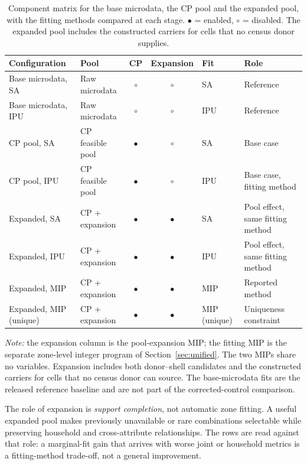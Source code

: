 \documentclass[review]{elsarticle}
\begin{document}
\begin{table}[htbp]
\centering
\caption{Component matrix for the base microdata, the CP pool and the expanded
pool, with the fitting methods compared at each stage. $\bullet$ = enabled,
$\circ$ = disabled. The expanded pool includes the constructed carriers for
cells that no census donor supplies.}
\label{tab:strategy_roles}
\footnotesize
\setlength{\tabcolsep}{3pt}
\begin{tabular}{@{}p{3.7cm}l*{2}{c}p{1.9cm}p{3.5cm}@{}}
\toprule
\textbf{Configuration} & \textbf{Pool} & \textbf{CP} & \textbf{Expansion} & \textbf{Fit} & \textbf{Role} \\
\midrule
Base microdata, SA  & Raw microdata    & $\circ$ & $\circ$ & SA  & Reference \\
Base microdata, IPU & Raw microdata    & $\circ$ & $\circ$ & IPU & Reference \\
CP pool, SA         & CP feasible pool & $\bullet$ & $\circ$ & SA  & Base case \\
CP pool, IPU        & CP feasible pool & $\bullet$ & $\circ$ & IPU & Base case, fitting method \\
Expanded, SA         & CP + expansion   & $\bullet$ & $\bullet$ & SA  & Pool effect, same fitting method \\
Expanded, IPU        & CP + expansion   & $\bullet$ & $\bullet$ & IPU & Pool effect, same fitting method \\
Expanded, MIP        & CP + expansion   & $\bullet$ & $\bullet$ & MIP & Reported method \\
Expanded, MIP (unique) & CP + expansion & $\bullet$ & $\bullet$ & MIP (unique) & Uniqueness constraint \\
\bottomrule
\end{tabular}
\end{table}

{\footnotesize\textit{Note:} the expansion column is the pool-expansion MIP;
the fitting MIP is the separate zone-level integer program of
Section~\ref{sec:unified}. The two MIPs share no variables. Expansion includes
both donor--shell candidates and the constructed carriers for cells that no
census donor can source. The base-microdata fits are the released reference
baseline and are not part of the corrected-control comparison.}

The role of expansion is \emph{support completion}, not automatic zone
fitting. A useful expanded pool makes previously unavailable or rare
combinations selectable while preserving household and cross-attribute
relationships. The rows are read against that role: a marginal-fit gain that
arrives with worse joint or household metrics is a fitting-method trade-off,
not a general improvement.
\end{document}
